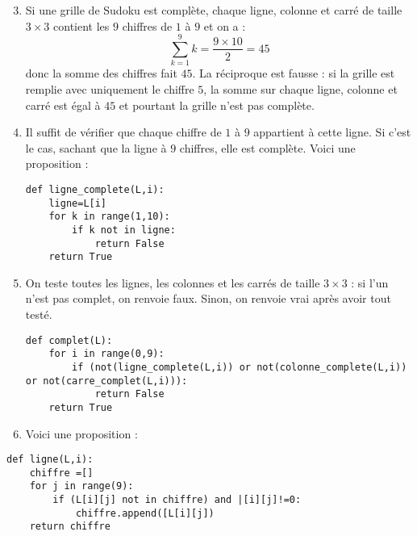 \documentclass[a4paper,9pt]{report}
\begin{document}
\medskip
\begin{enumerate}
\setcounter{enumi}{2}
\item Si une grille de Sudoku est complète, chaque ligne, colonne et carré de taille $3 \times 3$ contient les $9$ chiffres de $1$ à $9$ et on a :
$$ \sum_{k=1}^9 k = \dfrac{9 \times 10}{2} = 45$$
donc la somme des chiffres fait $45$. La réciproque est fausse : si la grille est remplie avec uniquement le chiffre $5$, la somme sur chaque ligne, colonne et carré est égal à $45$ et pourtant la grille n'est pas complète.
\item Il suffit de vérifier que chaque chiffre de $1$ à $9$ appartient à cette ligne. Si c'est le cas, sachant que la ligne à $9$ chiffres, elle est complète. Voici une proposition :

\begin{center}
\begin{minipage}{0.7\textwidth}
		
\begin{lstlisting}
def ligne_complete(L,i):
    ligne=L[i]
    for k in range(1,10):
        if k not in ligne:
    	    return False
    return True
\end{lstlisting}

\end{minipage}
\end{center}

\item On teste toutes les lignes, les colonnes et les carrés de taille $3 \times 3$ : si l'un n'est pas complet, on renvoie faux. Sinon, on renvoie vrai après avoir tout testé.

\begin{center}
\begin{minipage}{0.76\textwidth}
		
\begin{lstlisting}
def complet(L):
    for i in range(0,9):
        if (not(ligne_complete(L,i)) or not(colonne_complete(L,i)) or not(carre_complet(L,i))):
    	    return False
    return True 
\end{lstlisting}

\end{minipage}
\end{center}
\item Voici une proposition : 
\end{enumerate}

\begin{center}
\begin{minipage}{0.7\textwidth}
		
\begin{lstlisting}
def ligne(L,i):
    chiffre =[]
    for j in range(9):
        if (L[i][j] not in chiffre) and |[i][j]!=0:
            chiffre.append([L[i][j])
    return chiffre
\end{lstlisting}

\end{minipage}
\end{center}
\end{document}
